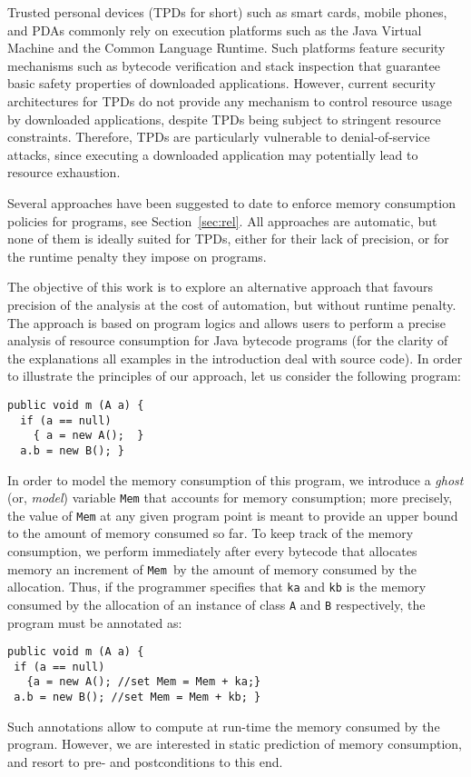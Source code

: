 
Trusted personal devices (TPDs for short) such as smart cards, mobile
phones, and PDAs commonly rely on execution platforms such as the Java
Virtual Machine and the Common Language Runtime. Such platforms
feature security mechanisms such as bytecode verification and stack
inspection that guarantee basic safety properties of downloaded
applications. However, current security architectures for TPDs do not
provide any mechanism to control resource usage by downloaded
applications, despite TPDs being subject to stringent resource
constraints.  Therefore, TPDs are particularly vulnerable to
denial-of-service attacks, since executing a downloaded application
may potentially lead to resource exhaustion.


Several approaches have been suggested to date to enforce memory
consumption policies for programs, see Section~\ref{sec:rel}.  All
approaches are automatic, but none of them is ideally suited for TPDs,
either for their lack of precision, or for the runtime penalty they
impose on programs.

The objective of this work is to explore an alternative approach that
favours precision of the analysis at the cost of automation, but
without runtime penalty. The approach is based on program logics and
allows users to perform a precise analysis of resource consumption for
Java bytecode programs (for the clarity of the explanations all
examples in the introduction deal with source code).  In order
to illustrate the principles of our approach, let us consider the
following program:
\begin{verbatim}
public void m (A a) {
  if (a == null) 
    { a = new A();  }  
  a.b = new B(); }
\end{verbatim}
In order to model the memory consumption of this program, we introduce
a {\em ghost} (or, {\em model}) variable \verb!Mem! that accounts for
memory consumption; more precisely, the value of \verb!Mem! at any
given program point is meant to provide an upper bound to the amount
of memory consumed so far. To keep track of the memory consumption, we
perform immediately after every bytecode that allocates memory an
increment of \verb!Mem!\ by the amount of memory consumed by the
allocation. Thus, if the programmer specifies that \verb!ka! and
\verb!kb! is the memory consumed by the allocation of an instance of
class \verb!A! and \verb!B! respectively, the program must be
annotated as:
\begin{verbatim} 
public void m (A a) {
 if (a == null) 
   {a = new A(); //set Mem = Mem + ka;}  
 a.b = new B(); //set Mem = Mem + kb; }
\end{verbatim}
Such annotations allow to compute at run-time the memory consumed by
the program. However, we are interested in static prediction of memory
consumption, and resort to pre- and postconditions to this end.  

